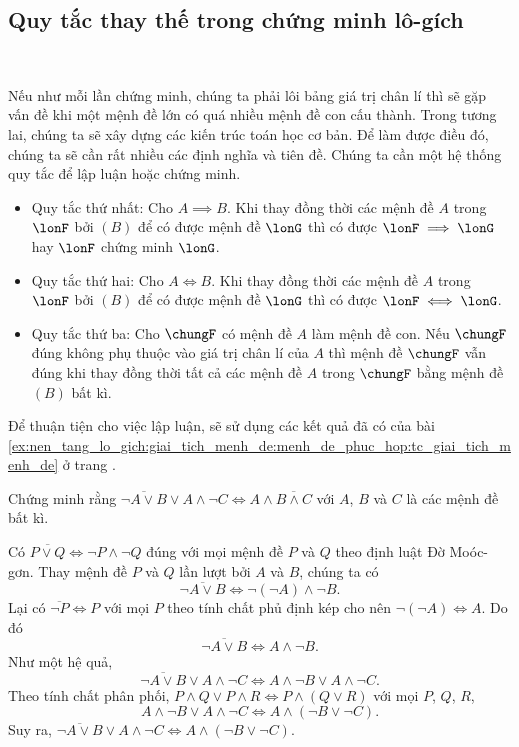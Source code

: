 \subsection{Quy tắc thay thế trong chứng minh lô-gích}

\ %

Nếu như mỗi lần chứng minh, chúng ta phải lôi bảng giá trị chân lí thì sẽ gặp vấn đề khi một mệnh đề lớn có quá nhiều mệnh đề con cấu thành. Trong tương lai, chúng ta sẽ xây dựng các kiến trúc toán học cơ bản. Để làm được điều đó, chúng ta sẽ cần rất nhiều các định nghĩa và tiên đề. Chúng ta cần một hệ thống quy tắc để lập luận hoặc chứng minh.

\begin{itemize}
    \item 
    \textcolor{colorEmphasisCyan}{Quy tắc thứ nhất}: Cho $A \implies B$. Khi thay đồng thời các mệnh đề $A$ trong $\lonF$ bởi $(B)$ để có được mệnh đề $\lonG$ thì có được $\lonF \implies \lonG$ hay $\lonF$ chứng minh $\lonG$.
    \item
    \textcolor{colorEmphasis}{Quy tắc thứ hai}: Cho $A \iff B$. Khi thay đồng thời các mệnh đề $A$ trong $\lonF$ bởi $(B)$ để có được mệnh đề $\lonG$ thì có được $\lonF \iff \lonG$.
    \item    
    \textcolor{colorEmphasisGreen}{Quy tắc thứ ba}: Cho $\chungF$ có mệnh đề $A$ làm mệnh đề con. Nếu $\chungF$ đúng không phụ thuộc vào giá trị chân lí của $A$ thì mệnh đề $\chungF$ vẫn đúng khi thay đồng thời tất cả các mệnh đề $A$ trong $\chungF$ bằng mệnh đề $(B)$ bất kì.
\end{itemize}

Để thuận tiện cho việc lập luận, sẽ sử dụng các kết quả đã có của bài \ref{ex:nen_tang_lo_gich:giai_tich_menh_de:menh_de_phuc_hop:tc_giai_tich_menh_de} ở trang \pageref{ex:nen_tang_lo_gich:giai_tich_menh_de:menh_de_phuc_hop:tc_giai_tich_menh_de}.

\exercise Chứng minh rằng $\overline{\neg A \lor B} \lor A \land \neg C \iff A \land \overline{B \land C}$ với $A$, $B$ và $C$ là các mệnh đề bất kì.

\solution
Có $\overline{P \lor Q} \iff \neg P \land \neg Q$ đúng với mọi mệnh đề $P$ và $Q$ theo định luật Đờ Moóc-gơn. Thay mệnh đề $P$ và $Q$ lần lượt bởi $A$ và $B$, chúng ta có
$$\overline{\neg A \lor B} \iff \neg (\neg A) \land \neg B.$$
Lại có $\overline{\neg P} \iff P$ với mọi $P$ theo tính chất phủ định kép cho nên $\neg(\neg A) \iff A$. Do đó
$$\overline{\neg A \lor B} \iff A \land \neg B.$$
Như một hệ quả,
$$\overline{\neg A \lor B} \lor A \land \neg C \iff A \land \neg B \lor A \land \neg C.$$
Theo tính chất phân phối, $P \land Q \lor P \land R \iff P \land (Q \lor R)$ với mọi $P$, $Q$, $R$,
$$A \land \neg B \lor A \land \neg C \iff A \land (\neg B \lor \neg C).$$
Suy ra, $\overline{\neg A \lor B} \lor A \land \neg C \iff A \land (\neg B \lor \neg C)$.

